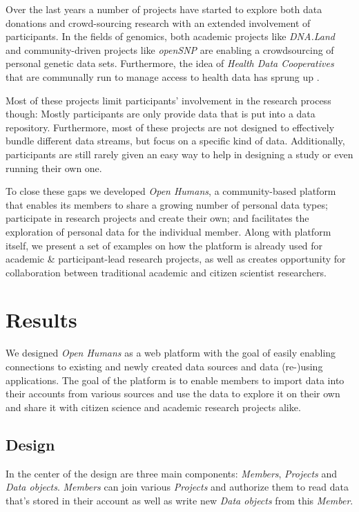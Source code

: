 \documentclass[a4paper,num-refs]{oup-contemporary}
\begin{document}
Over the last years a number of projects have started to explore both data donations and crowd-sourcing research with an extended involvement of participants. In the fields of genomics, both academic projects like \textit{DNA.Land} \cite{Yuan2018} and community-driven projects like \textit{openSNP} \cite{Greshake2014} are enabling a crowdsourcing of personal genetic data sets. Furthermore, the idea of \textit{Health Data Cooperatives} that are communally run to manage access to health data has sprung up \cite{Kossmann2014}.

Most of these projects limit participants' involvement in the research process though: Mostly participants are only provide data that is put into a data repository. Furthermore, most of these projects are not designed to effectively bundle different data streams, but focus on a specific kind of data. Additionally, participants are still rarely given an easy way to help in designing a study or even running their own one. 

To close these gaps we developed \textit{Open Humans}, a community-based platform that enables its members to share a growing number of personal data types; participate in research projects and create their own; and facilitates the exploration of personal data for the individual member. Along with platform itself, we present a set of examples on how the platform is already used for academic \& participant-lead research projects, as well as creates opportunity for collaboration between traditional academic and citizen scientist researchers.

\section{Results}
We designed \textit{Open Humans} as a web platform with the goal of easily enabling connections to existing and newly created data sources and data (re-)using applications. The goal of the platform is to enable members to import data into their accounts from various sources and use the data to explore it on their own and share it with citizen science and academic research projects alike.


\subsection{Design}
In the center of the design are three main components: \textit{Members}, \textit{Projects} and \textit{Data objects}. \textit{Members} can join various \textit{Projects} and authorize them to read data that's stored in their account as well as write new \textit{Data objects} from this \textit{Member}. 
\end{document}
